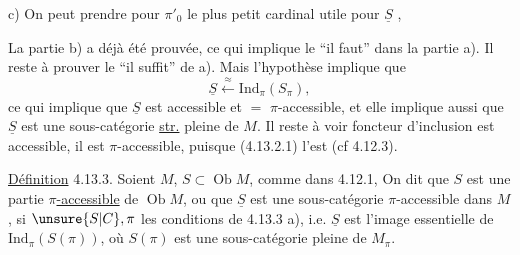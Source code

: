 c) On peut prendre  pour $\pi'_0$ le plus petit cardinal 
 utile pour $\underline S$ ,

La partie b)  a déjà été prouvée, ce
qui implique le ``il faut'' dans la partie
a). Il reste à prouver le ``il
suffit'' de a). Mais l'hypothèse
implique que
\[
 \underline S\xleftarrow{\approx}\mathrm{Ind}_\pi(S_\pi),
\]
ce qui implique que $\underline S$ est accessible
et $=$ $\pi$-accessible, et elle implique
aussi que $\underline S$ est une sous-catégorie
\uline{str.} pleine de $M$. Il reste à voir
 foncteur d'inclusion est accessible,
 il est $\pi$-accessible, puisque
(4.13.2.1) l'est (cf 4.12.3).

\uline{Définition} 4.13.3. Soient $M$, $S\subset\operatorname{Ob}M$,  comme
dans 4.12.1,  On dit que $S$ est
une partie \uline{$\pi$-accessible} de $\operatorname{Ob}M$,
ou que $\underline S$ est une sous-catégorie
$\pi$-accessible dans $M$, si 
  $\unsure{S|C},\pi$  les
conditions de 4.13.3 a), i.e.
$\underline S$ est l'image essentielle de $\mathrm{Ind}_\pi(S(\pi))$,
où $S(\pi)$ est une sous-catégorie pleine
de $M_\pi$.


